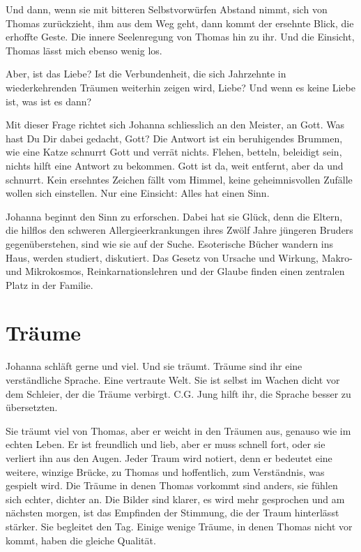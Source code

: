 \documentclass[10pt,a5paper]{book}
\begin{document}
Und dann, wenn sie mit bitteren Selbstvorwürfen Abstand nimmt, sich von Thomas zurückzieht, ihm aus dem Weg geht, dann kommt der ersehnte Blick, die erhoffte Geste. Die innere Seelenregung von Thomas hin zu ihr. Und die Einsicht, Thomas lässt mich ebenso wenig los.

Aber, ist das Liebe? Ist die Verbundenheit, die sich Jahrzehnte in wiederkehrenden Träumen weiterhin zeigen wird, Liebe? Und wenn es keine Liebe ist, was ist es dann?

Mit dieser Frage richtet sich Johanna schliesslich an den Meister, an Gott. Was hast Du Dir dabei gedacht, Gott? Die Antwort ist ein beruhigendes Brummen, wie eine Katze schnurrt Gott und verrät nichts. Flehen, betteln, beleidigt sein, nichts hilft eine Antwort zu bekommen. Gott ist da, weit entfernt, aber da und schnurrt. Kein ersehntes Zeichen fällt vom Himmel, keine geheimnisvollen Zufälle wollen sich einstellen. Nur eine Einsicht: Alles hat einen Sinn.

Johanna beginnt den Sinn zu erforschen. Dabei hat sie Glück, denn die Eltern, die hilflos den schweren Allergieerkrankungen ihres Zwölf Jahre jüngeren Bruders gegenüberstehen, sind wie sie auf der Suche. Esoterische Bücher wandern ins Haus, werden studiert, diskutiert. Das Gesetz von Ursache und Wirkung, Makro- und Mikrokosmos, Reinkarnationslehren und der Glaube finden einen zentralen Platz in der Familie.



\section*{Träume}



Johanna schläft gerne und viel. Und sie träumt. Träume sind ihr eine verständliche Sprache. Eine vertraute Welt. Sie ist selbst im Wachen dicht vor dem Schleier, der die Träume verbirgt. C.G. Jung hilft ihr, die Sprache besser zu übersetzten.

Sie träumt viel von Thomas, aber er weicht in den Träumen aus, genauso wie im echten Leben. Er ist freundlich und lieb, aber er muss schnell fort, oder sie verliert ihn aus den Augen. Jeder Traum wird notiert, denn er bedeutet eine weitere, winzige Brücke, zu Thomas und hoffentlich, zum Verständnis, was gespielt wird. Die Träume in denen Thomas vorkommt sind anders, sie fühlen sich echter, dichter an. Die Bilder sind klarer, es wird mehr gesprochen und am nächsten morgen, ist das Empfinden der Stimmung, die der Traum hinterlässt stärker. Sie begleitet den Tag.
Einige wenige Träume, in denen Thomas nicht vor kommt, haben die gleiche Qualität.
\end{document}
